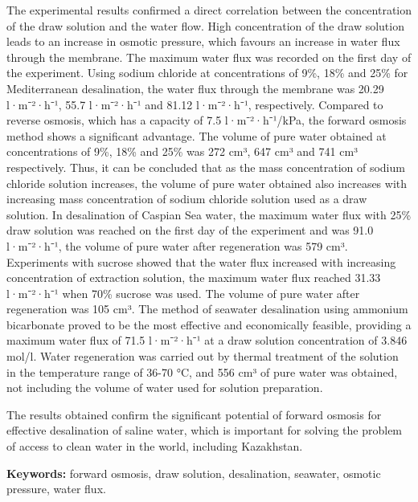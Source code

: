 The experimental results confirmed a direct correlation between the
concentration of the draw solution and the water flow. High
concentration of the draw solution leads to an increase in osmotic
pressure, which favours an increase in water flux through the membrane.
The maximum water flux was recorded on the first day of the experiment.
Using sodium chloride at concentrations of 9\%, 18\% and 25\% for
Mediterranean desalination, the water flux through the membrane was
20.29 l·m⁻²·h⁻¹, 55.7 l·m⁻²·h⁻¹ and 81.12 l·m⁻²·h⁻¹, respectively.
Compared to reverse osmosis, which has a capacity of 7.5 l·m⁻²·h⁻¹/kPa,
the forward osmosis method shows a significant advantage. The volume of
pure water obtained at concentrations of 9\%, 18\% and 25\% was 272 cm³,
647 cm³ and 741 cm³ respectively. Thus, it can be concluded that as the
mass concentration of sodium chloride solution increases, the volume of
pure water obtained also increases with increasing mass concentration of
sodium chloride solution used as a draw solution. In desalination of
Caspian Sea water, the maximum water flux with 25\% draw solution was
reached on the first day of the experiment and was 91.0 l·m⁻²·h⁻¹, the
volume of pure water after regeneration was 579 cm³. Experiments with
sucrose showed that the water flux increased with increasing
concentration of extraction solution, the maximum water flux reached
31.33 l·m⁻²·h⁻¹ when 70\% sucrose was used. The volume of pure water
after regeneration was 105 cm³. The method of seawater desalination
using ammonium bicarbonate proved to be the most effective and
economically feasible, providing a maximum water flux of 71.5 l·m⁻²·h⁻¹
at a draw solution concentration of 3.846 mol/l. Water regeneration was
carried out by thermal treatment of the solution in the temperature
range of 36-70 °C, and 556 cm³ of pure water was obtained, not including
the volume of water used for solution preparation.

The results obtained confirm the significant potential of forward
osmosis for effective desalination of saline water, which is important
for solving the problem of access to clean water in the world, including
Kazakhstan.

{\bfseries Keywords:} forward osmosis, draw solution, desalination,
seawater, osmotic pressure, water flux.

